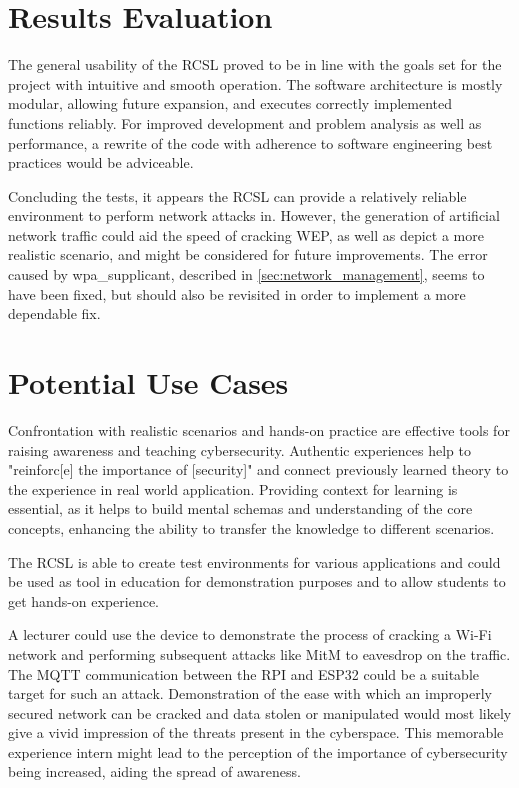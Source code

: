 \section{Results Evaluation}
The general usability of the RCSL proved to be in line with the goals set for the project with intuitive and smooth operation.
The software architecture is mostly modular, allowing future expansion, and executes correctly implemented functions reliably.
For improved development and problem analysis as well as performance, a rewrite of the code with adherence to software engineering best practices would be adviceable.

Concluding the tests, it appears the RCSL can provide a relatively reliable environment to perform network attacks in.
However, the generation of artificial network traffic could aid the speed of cracking WEP, as well as depict a more realistic scenario, and might be considered for future improvements.
The error caused by wpa\_supplicant, described in \cref{sec:network_management}, seems to have been fixed, but should also be revisited in order to implement a more dependable fix.


\section{Potential Use Cases}
Confrontation with realistic scenarios and hands-on practice are effective tools for raising awareness and teaching cybersecurity.
Authentic experiences help to "reinforc[e] the importance of [security]" \cite{mariano2024wifi} and connect previously learned theory to the experience in real world application. 
Providing context for learning is essential, as it helps to build mental schemas and understanding of the core concepts, enhancing the ability to transfer the knowledge to different scenarios. \cite[page~61]{Cybersec_Edu}

The RCSL is able to create test environments for various applications and could be used as tool in education for demonstration purposes and to allow students to get hands-on experience.

A lecturer could use the device to demonstrate the process of cracking a Wi-Fi network and performing subsequent attacks like MitM to eavesdrop on the traffic.
The MQTT communication between the RPI and ESP32 could be a suitable target for such an attack.
Demonstration of the ease with which an improperly secured network can be cracked and data stolen or manipulated would most likely give a vivid impression of the threats present in the cyberspace.
This memorable experience intern might lead to the perception of the importance of cybersecurity being increased, aiding the spread of awareness.

